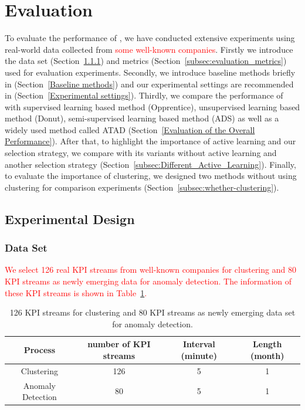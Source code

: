 \section{Evaluation}
\label{sec:evaluation}
To evaluate the performance of \name, we have conducted extensive experiments using real-world data collected from \textcolor{red}{some well-known companies}. Firstly we introduce the data set (Section~\ref{subsec:datasets}) and metrics (Section~\ref{subsec:evaluation_metrics}) used for evaluation experiments. Secondly, we introduce baseline methods briefly in (Section~\ref{Baseline methods}) and our experimental settings are recommended in (Section~\ref{Experimental settings}).
Thirdly, we compare the performance of \name{} with supervised learning based method (Opprentice), unsupervised learning based method (Donut), semi-supervised learning based method (ADS) as well as a widely used method called ATAD (Section~\ref{Evaluation of the Overall Performance}). After that, to highlight the importance of active learning and our selection strategy, we compare \name{} with its variants without active learning and another selection strategy (Section~\ref{subsec:Different_Active_Learning}). Finally, to evaluate the importance of clustering, we designed two methods without using clustering for comparison experiments (Section~\ref{subsec:whether-clustering}).

\subsection{Experimental Design}
\label{Experimental design}

\subsubsection{Data Set}
\label{subsec:datasets}

\textcolor{red}{We select 126 real KPI streams from well-known companies for clustering and 80 KPI streams as newly emerging data for anomaly detection. The information of these KPI streams is shown in Table~\ref{table:KPI streams}.}

\begin{table}
\caption{126 KPI streams for clustering and 80 KPI streams as newly emerging data set for anomaly detection.}
\label{table:KPI streams}
\begin{center}
\begin{tabular}{| c | c | c | c |}
\hline
\textbf{Process} & \textbf{number of KPI streams} & \textbf{Interval (minute)} & \textbf{Length (month)} \\ \hline
Clustering & 126 & 5 &	1 \\ \hline
Anomaly Detection & 80 & 5 &	1 \\ \hline
\end{tabular}
\end{center}
\vspace{0 mm}
\end{table}

